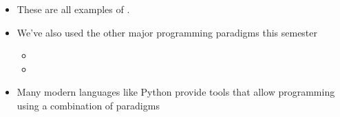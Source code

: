 \documentclass[letterpaper,10pt,english]{sphinxmanual}
\begin{document}
\begin{itemize}
\begin{itemize}
\end{itemize}

\item {} 
These are all examples of .

\item {} 
We’ve also used the other major programming paradigms this semester
\begin{itemize}
\item {} 

\item {} 

\end{itemize}

\item {} 
Many modern languages like Python provide tools that allow
programming using a combination of paradigms

\end{itemize}
\end{document}
